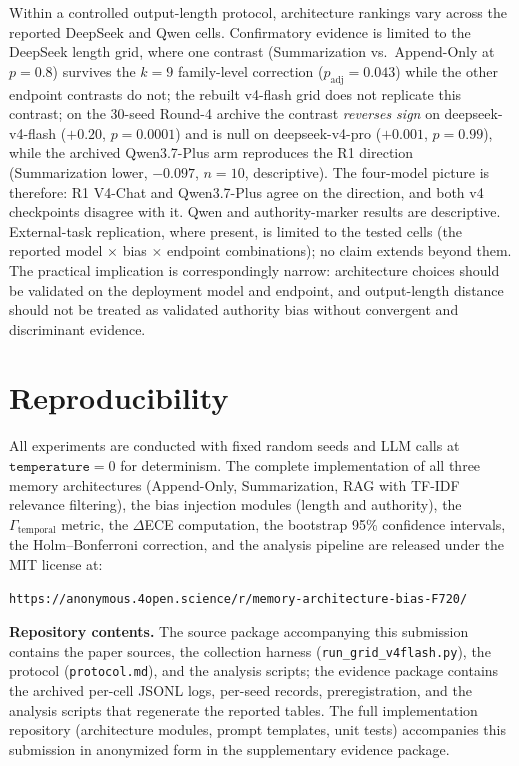 \documentclass[11pt]{article}
\begin{document}
Within a controlled output-length protocol, architecture rankings vary across the reported DeepSeek and Qwen cells. Confirmatory evidence is limited to the DeepSeek length grid, where one contrast (Summarization vs.\ Append-Only at $p{=}0.8$) survives the $k{=}9$ family-level correction ($p_{\text{adj}}{=}0.043$) while the other endpoint contrasts do not; the rebuilt v4-flash grid does not replicate this contrast; on the 30-seed Round-4 archive the contrast \emph{reverses sign} on deepseek-v4-flash ($+0.20$, $p{=}0.0001$) and is null on deepseek-v4-pro ($+0.001$, $p{=}0.99$), while the archived Qwen3.7-Plus arm reproduces the R1 direction (Summarization lower, $-0.097$, $n{=}10$, descriptive). The four-model picture is therefore: R1 V4-Chat and Qwen3.7-Plus agree on the direction, and both v4 checkpoints disagree with it. Qwen and authority-marker results are descriptive. External-task replication, where present, is limited to the tested cells (the reported model $\times$ bias $\times$ endpoint combinations); no claim extends beyond them. The practical implication is correspondingly narrow: architecture choices should be validated on the deployment model and endpoint, and output-length distance should not be treated as validated authority bias without convergent and discriminant evidence.


\section*{Reproducibility}
\label{sec:reproducibility}

All experiments are conducted with fixed random seeds and LLM calls at $\texttt{temperature}=0$ for determinism. The complete implementation of all three memory architectures (Append-Only, Summarization, RAG with TF-IDF relevance filtering), the bias injection modules (length and authority), the $\Gamma_\text{temporal}$ metric, the $\Delta$ECE computation, the bootstrap 95\% confidence intervals, the Holm--Bonferroni correction, and the analysis pipeline are released under the MIT license at:

\begin{center}
\texttt{https://anonymous.4open.science/r/memory-architecture-bias-F720/}
\end{center}

\noindent\textbf{Repository contents.}
The source package accompanying this submission contains the paper sources, the collection harness (\texttt{run\_grid\_v4flash.py}), the protocol (\texttt{protocol.md}), and the analysis scripts; the evidence package contains the archived per-cell JSONL logs, per-seed records, preregistration, and the analysis scripts that regenerate the reported tables. The full implementation repository (architecture modules, prompt templates, unit tests) accompanies this submission in anonymized form in the supplementary evidence package.
\end{document}
